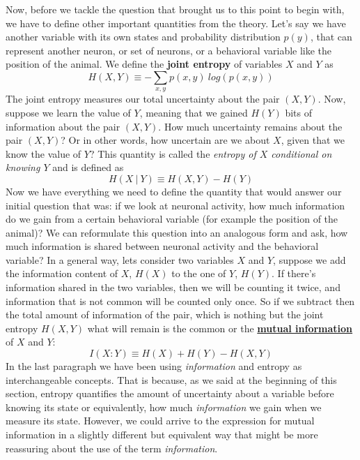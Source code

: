 Now, before we tackle the question that brought us to this point to begin with, we have to define other important quantities from the theory.
Let's say we have another variable with its own states and probability distribution ${p(y)}$, that can represent another neuron, or set of neurons, or a behavioral variable like the position of the animal. 
We define the \textbf{joint entropy} of variables $X$ and $Y$ as
\begin{equation}
\label{eqn:jointentropy}
    H(X,Y)\equiv-\sum_{x,y}p(x,y)\ log(p(x,y)) 
\end{equation}
The joint entropy measures our total uncertainty about the pair $(X,Y)$.
Now, suppose we learn the value of $Y$, meaning that we gained $H(Y)$ bits of information about the pair $(X,Y)$.
How much uncertainty remains about the pair $(X,Y)$? 
Or in other words, how uncertain are we about $X$, given that we know the value of $Y$?
This quantity is called the \textit{entropy of $X$ conditional on knowing $Y$} and is defined as
\begin{equation}
\label{eqn:condentropy}
    H(X\ |\ Y) \equiv H(X,Y)-H(Y)
\end{equation}
Now we have everything we need to define the quantity that would answer our initial question that was: if we look at neuronal activity, how much information do we gain from a certain behavioral variable (for example the position of the animal)? 
We can reformulate this question into an analogous form and ask, how much information is shared between neuronal activity and the behavioral variable?
In a general way, lets consider two variables $X$ and $Y$, suppose we add the information content of $X$, $H(X)$ to the one of $Y$, $H(Y)$.
If there's information shared in the two variables, then we will be counting it twice, and information that is not common will be counted only once. 
So if we subtract then the total amount of information of the pair, which is nothing but the joint entropy $H(X,Y)$ what will remain is the common or the \underline{\textbf{mutual information}} of $X$ and $Y$:
\begin{equation}
\label{eqn:mutualinfo1}
    I(X:Y)\equiv H(X)+H(Y)-H(X,Y)
\end{equation}
In the last paragraph we have been using \textit{information} and entropy as interchangeable concepts.
That is because, as we said at the beginning of this section, entropy quantifies the amount of uncertainty about a variable before knowing its state or equivalently, how much \textit{information} we gain when we measure its state.
However, we could arrive to the expression for mutual information in a slightly different but equivalent way that might be more reassuring about the use of the term \textit{information}.
